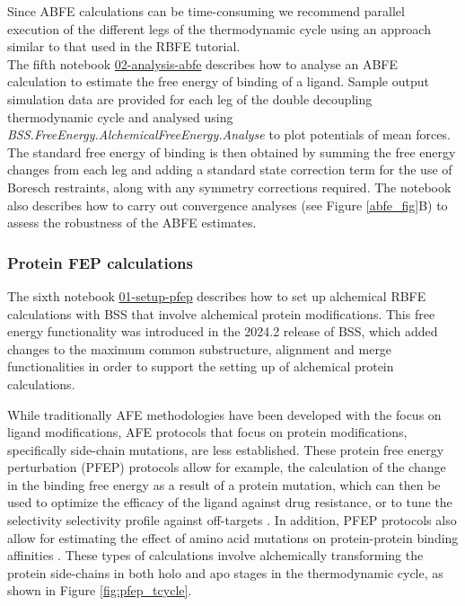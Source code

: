 Since ABFE calculations can be time-consuming we recommend parallel execution of the different legs of the thermodynamic cycle using an approach similar to that used in the RBFE tutorial.
\\

The fifth notebook \href{https://github.com/OpenBioSim/biosimspace_tutorials/blob/main/04_fep/03_ABFE/02_analysis_abfe.ipynb}{02-analysis-abfe} describes how to analyse an ABFE calculation to estimate the free energy of binding of a ligand. Sample output simulation data are provided for each leg of the double decoupling thermodynamic cycle and analysed using \textit{BSS.FreeEnergy.AlchemicalFreeEnergy.Analyse} to plot potentials of mean forces. The standard free energy of binding is then obtained by summing the free energy changes from each leg and adding a standard state correction term for the use of Boresch restraints, along with any symmetry corrections required. The notebook also describes how to carry out convergence analyses (see Figure \ref{abfe_fig}B) to assess the robustness of the ABFE estimates.  

\subsubsection{Protein FEP calculations}

The sixth notebook \href{https://github.com/OpenBioSim/biosimspace_tutorials/blob/main/04_fep/04_PFEP/01_setup_pfep.ipynb}{01-setup-pfep} describes how to set up alchemical RBFE calculations with BSS that involve alchemical protein modifications. This free energy functionality was introduced in the 2024.2 release of BSS, which added changes to the maximum common substructure, alignment and merge functionalities in order to support the setting up of alchemical protein calculations.

While traditionally AFE methodologies have been developed with the focus on ligand modifications, AFE protocols that focus on protein modifications, specifically side-chain mutations, are less established. These protein free energy perturbation (PFEP) protocols allow for example, the calculation of the change in the binding free energy as a result of a protein mutation, which can then be used to optimize the efficacy of the ligand against drug resistance, or to tune the selectivity selectivity profile against off-targets \cite{doi:10.1021/acscentsci.8b00717}. In addition, PFEP protocols also allow for estimating the effect of amino acid mutations on protein-protein binding affinities \cite{doi:10.1021/acs.jctc.3c00333}. These types of calculations involve alchemically transforming the protein side-chains in both holo and apo stages in the thermodynamic cycle, as shown in Figure \ref{fig:pfep_tcycle}.

